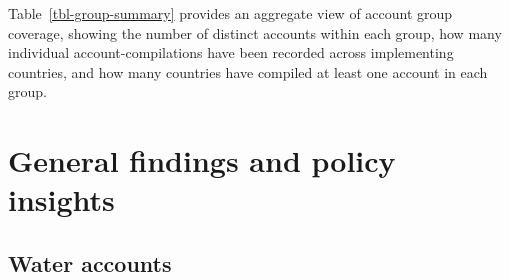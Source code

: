 \documentclass[
  letterpaper,
  DIV=11,
  numbers=noendperiod]{scrartcl}
\begin{document}
Table~\ref{tbl-group-summary} provides an aggregate view of account
group coverage, showing the number of distinct accounts within each
group, how many individual account-compilations have been recorded
across implementing countries, and how many countries have compiled at
least one account in each group.

\begin{table}

\caption{\label{tbl-group-summary}Summary of SEEA account coverage by
account group across the 11 implementing AFE countries.}


\end{table}%

\section{General findings and policy
insights}\label{general-findings-and-policy-insights}

\subsection{Water accounts}\label{water-accounts}
\end{document}
